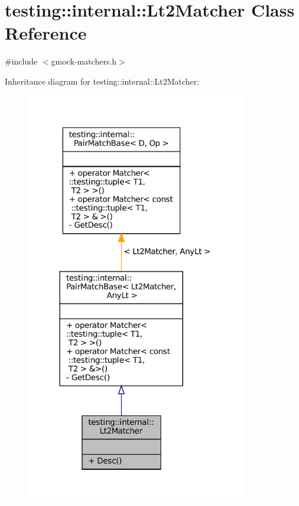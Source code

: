 \hypertarget{classtesting_1_1internal_1_1Lt2Matcher}{}\section{testing\+:\+:internal\+:\+:Lt2\+Matcher Class Reference}
\label{classtesting_1_1internal_1_1Lt2Matcher}


{\ttfamily \#include $<$gmock-\/matchers.\+h$>$}



Inheritance diagram for testing\+:\+:internal\+:\+:Lt2\+Matcher\+:
\nopagebreak
\begin{figure}[H]
\begin{center}
\leavevmode
\includegraphics[width=272pt]{classtesting_1_1internal_1_1Lt2Matcher__inherit__graph}
\end{center}
\end{figure}


